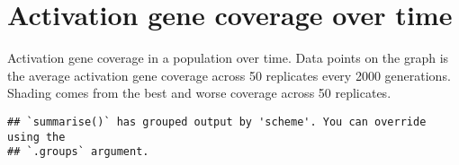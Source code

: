 \documentclass[]{book}
\newenvironment{Shaded}{\begin{snugshade}}{\end{snugshade}}
\newcommand{\DataTypeTok}[1]{\textcolor[rgb]{0.13,0.29,0.53}{#1}}
\newcommand{\KeywordTok}[1]{\textcolor[rgb]{0.13,0.29,0.53}{\textbf{#1}}}
\newcommand{\NormalTok}[1]{#1}
\newcommand{\OperatorTok}[1]{\textcolor[rgb]{0.81,0.36,0.00}{\textbf{#1}}}
\newcommand{\StringTok}[1]{\textcolor[rgb]{0.31,0.60,0.02}{#1}}
\begin{document}
\hypertarget{activation-gene-coverage-over-time-1}{%
\section{Activation gene coverage over time}\label{activation-gene-coverage-over-time-1}}

Activation gene coverage in a population over time.
Data points on the graph is the average activation gene coverage across 50 replicates every 2000 generations.
Shading comes from the best and worse coverage across 50 replicates.

\begin{Shaded}
\end{Shaded}

\begin{verbatim}
## `summarise()` has grouped output by 'scheme'. You can override using the
## `.groups` argument.
\end{verbatim}
\end{document}
